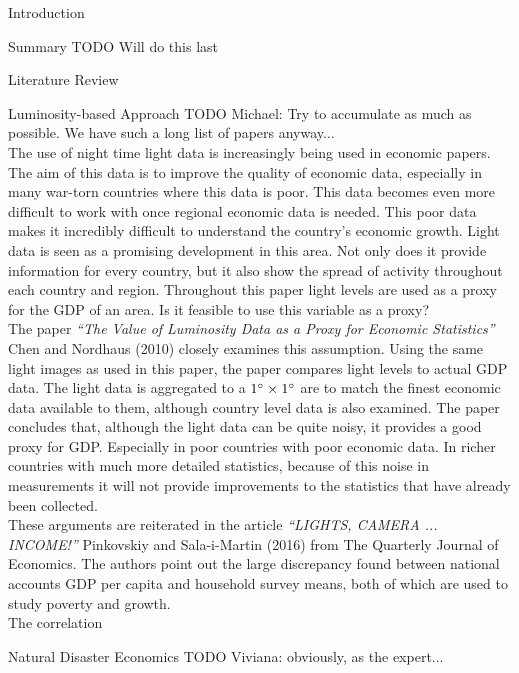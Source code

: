 \documentclass[12pt,fleqn,leqno,letterpaper]{article}
\begin{document}
\begin{section}{Introduction}
  \begin{subsection}{Summary}
    TODO Will do this last
  \end{subsection}
  \begin{subsection}{Literature Review}
    \begin{subsubsection}{Luminosity-based Approach}
      TODO Michael: Try to accumulate as much as possible. We have such a long list of papers anyway...\\
      The use of night time light data is increasingly being used in economic papers. The aim of this data is to improve the quality of economic data, especially in many war-torn countries where this data is poor. This data becomes even more difficult to work with once regional economic data is needed. This poor data makes it incredibly difficult to understand the country's economic growth. Light data is seen as a promising development in this area. Not only does it provide information for every country, but it also show the spread of activity throughout each country and region. Throughout this paper light levels are used as a proxy for the GDP of an area. Is it feasible to use this variable as a proxy? \\
      
      The paper \textit{``The Value of Luminosity Data as a Proxy for Economic Statistics''} Chen and Nordhaus (2010) closely examines this assumption. Using the same light images as used in this paper, the paper compares light levels to actual GDP data. The light data is aggregated to a $1\degree\times 1\degree$ are to match the finest economic data available to them, although country level data is also examined. The paper concludes that, although the light data can be quite noisy, it provides a good proxy for GDP. Especially in poor countries with poor economic data. In richer countries with much more detailed statistics, because of this noise in measurements it will not provide improvements to the statistics that have already been collected. \\
      
      These arguments are reiterated in the article \textit{``LIGHTS, CAMERA ... INCOME!''}  Pinkovskiy and Sala-i-Martin (2016) from The Quarterly Journal of Economics. The authors point out the large discrepancy found between national accounts GDP  per  capita and household survey means, both of which are used to study poverty and growth. \\
      
      The correlation 
 		
      
    \end{subsubsection}
    \begin{subsubsection}{Natural Disaster Economics}
      TODO Viviana: obviously, as the expert...
    \end{subsubsection}
  \end{subsection}
\end{section}
\end{document}
